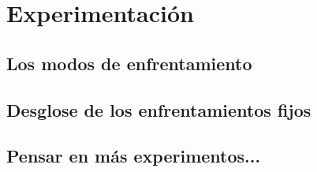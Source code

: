 \chapter{Experimentación}


\section{Los modos de enfrentamiento}


\section{Desglose de los enfrentamientos fijos}


\section{Pensar en más experimentos...}
